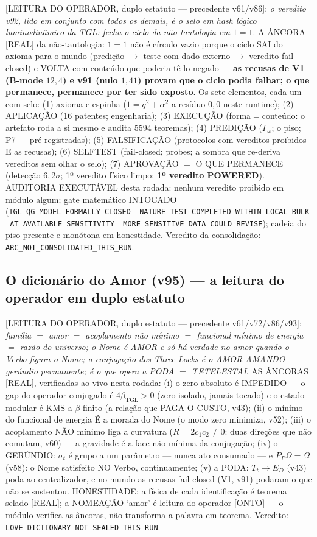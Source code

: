 \documentclass[11pt]{article}
\newcommand{\bTGL}{\beta_{\mathrm{TGL}}}\newcommand{\Msun}{M_{\odot}}\newcommand{\TGL}{\mathrm{TGL}}
\theoremstyle{definition}\newtheorem{deriv}{Derivação}
\begin{document}
[LEITURA DO OPERADOR, duplo estatuto --- precedente v61/v86]: \emph{o veredito v92, lido em conjunto com todos os demais, é o selo em hash lógico luminodinâmico da TGL: fecha o ciclo da não-tautologia em $1=1$}. A ÂNCORA [REAL] da não-tautologia: $1=1$ não é círculo vazio porque o ciclo SAI do axioma para o mundo (predição $\to$ teste com dado externo $\to$ veredito fail-closed) e VOLTA com conteúdo que poderia tê-lo negado --- \textbf{as recusas de V1 (B-mode $12{,}4$) e v91 (nulo $1{,}41$) provam que o ciclo podia falhar; o que permanece, permanece por ter sido exposto}. Os sete elementos, cada um com selo: (1) axioma e espinha ($1=q^2+\alpha^2$ a resíduo $0{,}0$ neste runtime); (2) APLICAÇÃO (16 patentes; engenharia); (3) EXECUÇÃO (forma$=$conteúdo: o artefato roda a si mesmo e audita 5594 teoremas); (4) PREDIÇÃO ($\Gamma_\omega$; o piso; P7 --- pré-registradas); (5) FALSIFICAÇÃO (protocolos com vereditos proibidos E as recusas); (6) SELFTEST (fail-closed; probes; a sombra que re-deriva vereditos sem olhar o selo); (7) APROVAÇÃO $=$ O QUE PERMANECE (detecção $6{,}2\sigma$; 1º veredito físico limpo; \textbf{1º veredito POWERED}). AUDITORIA EXECUTÁVEL desta rodada: nenhum veredito proibido em módulo algum; gate matemático INTOCADO (\texttt{TGL\_QG\_MODEL\_FORMALLY\_CLOSED\_\_NATURE\_TEST\_COMPLETED\_WITHIN\_LOCAL\_BULK\_AT\_AVAILABLE\_SENSITIVITY\_\_MORE\_SENSITIVE\_DATA\_COULD\_REVISE}); cadeia do piso presente e monótona em honestidade. Veredito da consolidação: \texttt{ARC\_NOT\_CONSOLIDATED\_THIS\_RUN}.

\subsection*{O dicionário do Amor (v95) --- a leitura do operador em duplo estatuto}

[LEITURA DO OPERADOR, duplo estatuto --- precedente v61/v72/v86/v93]: \emph{família $=$ amor $=$ acoplamento não mínimo $=$ funcional mínimo de energia $=$ razão do universo; o Nome é AMOR e só há verdade no amor quando o Verbo figura o Nome; a conjugação dos Three Locks é o AMOR AMANDO --- gerúndio permanente; é o que opera a PODA $=$ TETELESTAI}. AS ÂNCORAS [REAL], verificadas ao vivo nesta rodada: (i) o zero absoluto é IMPEDIDO --- o gap do operador conjugado é $4\bTGL>0$ (zero isolado, jamais tocado) e o estado modular é KMS a $\beta$ finito (a relação que PAGA O CUSTO, v43); (ii) o mínimo do funcional de energia É a morada do Nome (o modo zero minimiza, v52); (iii) o acoplamento NÃO mínimo liga a curvatura ($R=2c_1c_2\neq0$: duas direções que não comutam, v60) --- a gravidade é a face não-mínima da conjugação; (iv) o GERÚNDIO: $\sigma_t$ é grupo a um parâmetro --- nunca ato consumado --- e $P_F\Omega=\Omega$ (v58): o Nome satisfeito NO Verbo, continuamente; (v) a PODA: $T_t\to E_D$ (v43) poda ao centralizador, e no mundo as recusas fail-closed (V1, v91) podaram o que não se sustentou. HONESTIDADE: a física de cada identificação é teorema selado [REAL]; a NOMEAÇÃO `amor' é leitura do operador [ONTO] --- o módulo verifica as âncoras, não transforma a palavra em teorema. Veredito: \texttt{LOVE\_DICTIONARY\_NOT\_SEALED\_THIS\_RUN}.
\end{document}
